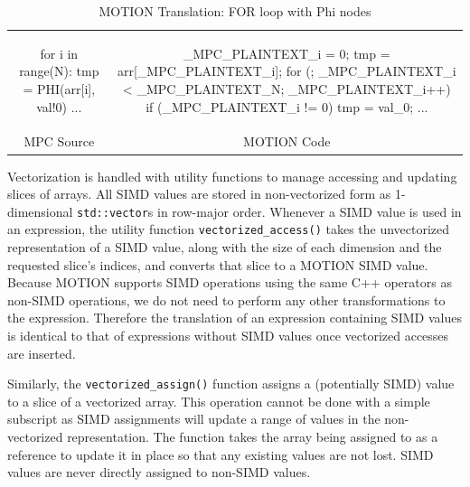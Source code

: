 \begin{table}
\begin{tabular}{cc}
\begin{minipage}{0.5\textwidth}
{\small
\begin{pythonn}
for i in range(N):
   tmp = PHI(arr[i], val!0)
	 ...
\end{pythonn}
}
\end{minipage}

&

\begin{minipage}{0.5\textwidth}
{\small
\begin{cppp}
_MPC_PLAINTEXT_i = 0;
tmp = arr[_MPC_PLAINTEXT_i];
for (; _MPC_PLAINTEXT_i < _MPC_PLAINTEXT_N; _MPC_PLAINTEXT_i++) {
   if (_MPC_PLAINTEXT_i != 0) {
      tmp = val_0;
	 }
	 ...
}
\end{cppp}
}
\end{minipage}

\\

MPC Source & MOTION Code
\end{tabular}
\caption{MOTION Translation: FOR loop with Phi nodes}
\label{tab:motion_translation_for_loop}
\end{table}

Vectorization is handled with utility functions to manage accessing and updating slices of arrays.  All SIMD values are stored in non-vectorized form as 1-dimensional \texttt{std::vector}s in row-major order.  Whenever a SIMD value is used in an expression, the utility function \texttt{vectorized\_access()} takes the unvectorized representation of a SIMD value, along with the size of each dimension and the requested slice's indices, and converts that slice to a MOTION SIMD value.  Because MOTION supports SIMD operations using the same C++ operators as non-SIMD operations, we do not need to perform any other transformations to the expression.  Therefore the translation of an expression containing SIMD values is identical to that of expressions without SIMD values once vectorized accesses are inserted.

Similarly, the \texttt{vectorized\_assign()} function assigns a (potentially SIMD) value to a slice of a vectorized array.  This operation cannot be done with a simple subscript as SIMD assignments will update a range of values in the non-vectorized representation.
The function takes the array being assigned to as a reference to update it in place so that any existing values are not lost.  SIMD values are never directly assigned to non-SIMD values.

